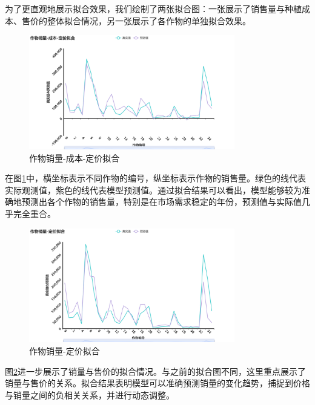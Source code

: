 \documentclass[12pt,a4paper]{nmmcm}
\begin{document}
为了更直观地展示拟合效果，我们绘制了两张拟合图：一张展示了销售量与种植成本、售价的整体拟合情况，另一张展示了各作物的单独拟合效果。

\begin{figure}[H]
  \centering
  \includegraphics[width=0.8\textwidth]{figures/prob3/correlation/作物销量-成本-定价拟合.png}
  \caption{作物销量-成本-定价拟合}
  \label{fig:fitting1}
\end{figure}

在图\ref{fig:fitting1}中，横坐标表示不同作物的编号，纵坐标表示作物的销售量。绿色的线代表实际观测值，紫色的线代表模型预测值。通过拟合结果可以看出，模型能够较为准确地预测出各个作物的销售量，特别是在市场需求稳定的年份，预测值与实际值几乎完全重合。

\begin{figure}[H]
  \centering
  \includegraphics[width=0.8\textwidth]{figures/prob3/correlation/作物销量-定价拟合.png}
  \caption{作物销量-定价拟合}
  \label{fig:fitting2}
\end{figure}

图\ref{fig:fitting2}进一步展示了销量与售价的拟合情况。与之前的拟合图不同，这里重点展示了销量与售价的关系。拟合结果表明模型可以准确预测销量的变化趋势，捕捉到价格与销量之间的负相关关系，并进行动态调整。
\end{document}
